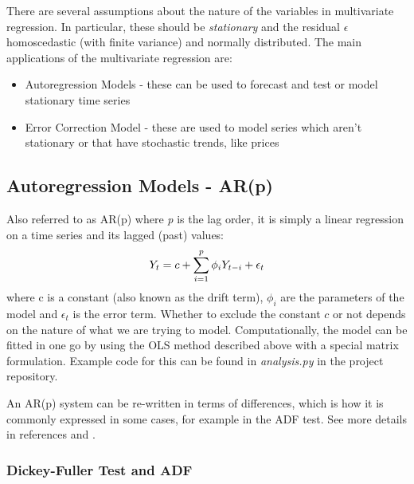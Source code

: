 \documentclass[11pt]{article}
\providecommand{\tightlist}{%
      \setlength{\itemsep}{0pt}\setlength{\parskip}{0pt}}
\begin{document}
\begin{appendices}
There are several assumptions about the nature of the variables in multivariate regression. In particular, these should be \emph{stationary} and the residual
\(\epsilon\) homoscedastic (with finite variance) and normally
distributed.
The main applications of the multivariate regression are:

\begin{itemize}
\tightlist
\item  Autoregression Models -  these can be used to
forecast and test or model stationary time series 

\item  Error Correction Model -  these
are used to model series which aren't stationary or that have stochastic
trends, like prices
\end{itemize}


    \subsection{Autoregression Models - AR(p)}\label{autoregression-models---arp}
    
Also referred to as AR(p) where \emph{p} is the lag order, it is
simply a linear regression on a time series and its lagged (past)
values:
\begin{equation}
Y_t = c + \sum^{p}_{i=1} \phi_i Y_{t-i} + \epsilon_t \\
\end{equation}
where c is a constant (also known as the drift term), \(\phi_i\) are the
parameters of the model and \(\epsilon_t\) is the error term. Whether to
exclude the constant \(c\) or not depends on the nature of what we are
trying to model.
Computationally, the model can be fitted in one go by using the OLS
method described above with a special matrix formulation. Example code
for this can be found in \emph{analysis.py} in the project repository.

An AR(p) system can be re-written in terms of
differences, which is how it is commonly expressed
in some cases, for example in the ADF test. See more details in references \cite{wikiVAR} and \cite{wikiAR}.


    \subsubsection{Dickey-Fuller Test and ADF}\label{dickey-fuller-test-and-adf}
    

\end{appendices}
\end{document}
